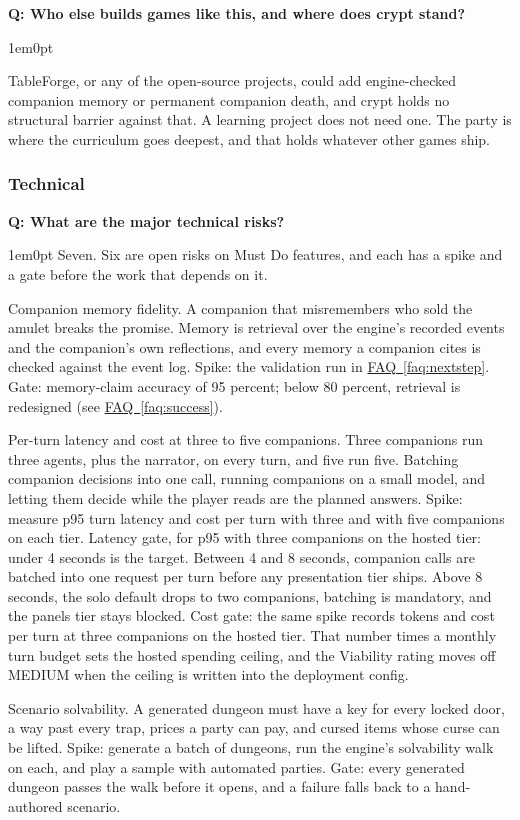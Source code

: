 \documentclass[11pt,letterpaper]{article}
\newcounter{faqnum}
\newenvironment{faqpair}[1]{%
  \needspace{4\baselineskip}\vspace{0.5em}\refstepcounter{faqnum}%
  \noindent\textbf{\color{SectionBlue}Q\thefaqnum: #1}\par\nopagebreak[4]%
  \vspace{0.2em}\begin{adjustwidth}{1em}{0pt}\setlength{\parindent}{0pt}%
}{\end{adjustwidth}\vspace{0.5em}}
\newcommand{\faqref}[1]{\hyperref[#1]{FAQ~\ref*{#1}}}
\begin{document}
\begin{faqpair}{Who else builds games like this, and where does crypt stand?}
TableForge, or any of the open-source projects, could add engine-checked
companion memory or permanent companion death, and crypt holds no
structural barrier against that. A
learning project does not need one. The party is where the curriculum goes
deepest, and that holds whatever other games ship.
\end{faqpair}

\subsubsection*{Technical}

\begin{faqpair}{What are the major technical risks?}\label{faq:risks}
Seven. Six are open risks on Must Do features, and each has a spike and a
gate before the work that depends on it.

Companion memory fidelity. A companion that misremembers who sold the
amulet breaks the promise. Memory is retrieval over the engine's recorded
events and the companion's own reflections, and every memory a companion
cites is checked against the event log. Spike: the validation run in
\faqref{faq:nextstep}. Gate: memory-claim accuracy of 95 percent; below 80
percent, retrieval is redesigned (see \faqref{faq:success}).

Per-turn latency and cost at three to five companions. Three companions run
three agents, plus the narrator, on every turn, and five run five.
Batching companion decisions into one call, running companions on a small
model, and letting them decide while the player reads are the planned
answers. Spike: measure p95 turn latency and cost per turn with three and
with five companions on each tier. Latency gate, for p95 with three
companions on the hosted tier: under 4 seconds is the target. Between 4 and
8 seconds, companion calls are batched into one request per turn before any
presentation tier ships. Above 8 seconds, the solo default drops to two
companions, batching is mandatory, and the panels tier stays blocked. Cost
gate: the same spike records tokens and cost per turn at three companions
on the hosted tier. That number times a monthly turn budget sets the hosted
spending ceiling, and the Viability rating moves off MEDIUM when the ceiling
is written into the deployment config.

Scenario solvability. A generated dungeon must have a key for every locked
door, a way past every trap, prices a party can pay, and cursed items whose
curse can be lifted. Spike: generate a batch of dungeons, run the engine's
solvability walk on each, and play a sample with automated parties. Gate:
every generated dungeon passes the walk before it opens, and a failure
falls back to a hand-authored scenario.


\end{faqpair}
\end{document}
